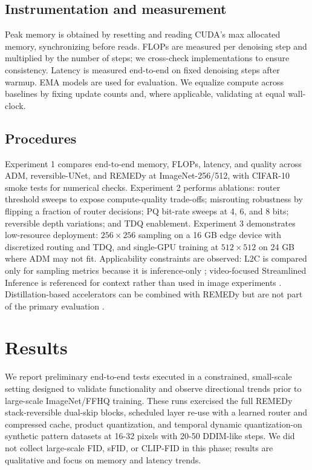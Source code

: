 \documentclass{article}
\begin{document}
\subsection{Instrumentation and measurement}
Peak memory is obtained by resetting and reading CUDA's max allocated memory, synchronizing before reads. FLOPs are measured per denoising step and multiplied by the number of steps; we cross-check implementations to ensure consistency. Latency is measured end-to-end on fixed denoising steps after warmup. EMA models are used for evaluation. We equalize compute across baselines by fixing update counts and, where applicable, validating at equal wall-clock.

\subsection{Procedures}
Experiment 1 compares end-to-end memory, FLOPs, latency, and quality across ADM, reversible-UNet, and REMEDy at ImageNet-256/512, with CIFAR-10 smoke tests for numerical checks. Experiment 2 performs ablations: router threshold sweeps to expose compute-quality trade-offs; misrouting robustness by flipping a fraction of router decisions; PQ bit-rate sweeps at 4, 6, and 8 bits; reversible depth variations; and TDQ enablement. Experiment 3 demonstrates low-resource deployment: $256\times 256$ sampling on a 16 GB edge device with discretized routing and TDQ, and single-GPU training at $512\times 512$ on 24 GB where ADM may not fit. Applicability constraints are observed: L2C is compared only for sampling metrics because it is inference-only \cite{ma_2024_learning}; video-focused Streamlined Inference is referenced for context rather than used in image experiments \cite{zhan_2024_fast}. Distillation-based accelerators can be combined with REMEDy but are not part of the primary evaluation \cite{salimans_2024_multistep}.

\section{Results}
We report preliminary end-to-end tests executed in a constrained, small-scale setting designed to validate functionality and observe directional trends prior to large-scale ImageNet/FFHQ training. These runs exercised the full REMEDy stack-reversible dual-skip blocks, scheduled layer re-use with a learned router and compressed cache, product quantization, and temporal dynamic quantization-on synthetic pattern datasets at 16-32 pixels with 20-50 DDIM-like steps. We did not collect large-scale FID, sFID, or CLIP-FID in this phase; results are qualitative and focus on memory and latency trends.
\end{document}
